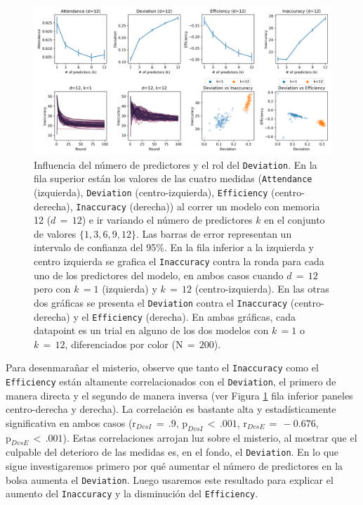 \documentclass[11pt]{amsart}
\begin{document}
\begin{figure}
\begin{center}
\includegraphics[width=.9\linewidth]{./Figuras/Figura2.png}
\caption{Influencia del número de predictores y el rol del \texttt{Deviation}. En la fila superior están los valores de las cuatro medidas (\texttt{Attendance} (izquierda), \texttt{Deviation} (centro-izquierda), \texttt{Efficiency} (centro-derecha), \texttt{Inaccuracy} (derecha)) al correr un modelo con memoria 12 ($d\,{=}\,12$) e ir variando el número de predictores $k$ en el conjunto de valores $\{1,3,6,9,12\}$. Las barras de error representan un intervalo de confianza del 95\%. En la fila inferior a la izquierda y centro izquierda se grafica el \texttt{Inaccuracy} contra la ronda para cada uno de los predictores del modelo, en ambos casos cuando $d\,{=}\,12$ pero con $k\,{=}1$ (izquierda) y $k\,{=}\,12$ (centro-izquierda). En las otras dos gráficas se presenta el \texttt{Deviation} contra el \texttt{Inaccuracy} (centro-derecha) y el \texttt{Efficiency} (derecha). En ambas gráficas, cada datapoint es un trial en alguno de los dos modelos con $k\,{=}1$ o $k\,{=}\,12$, diferenciados por color ($\mbox{N}\,{=}\,200$).}\label{fig:dev}
\end{center}
\end{figure}

Para desenmarañar el misterio, observe que tanto el \texttt{Inaccuracy} como el \texttt{Efficiency} están altamente correlacionados con el \texttt{Deviation}, el primero de manera directa y el segundo de manera inversa (ver Figura \ref{fig:dev} fila inferior paneles centro-derecha y derecha). La correlación es bastante alta y estadísticamente significativa en ambos casos ($\mbox{r}_{DvsI}\,{=}\,.9$, $\mbox{p}_{DvsI}\,{<}\,.001$, $\mbox{r}_{DvsE}\,{=}\,-0.676$, $\mbox{p}_{DvsE}\,{<}\,.001$). Estas correlaciones arrojan luz sobre el misterio, al mostrar que el culpable del deterioro de las medidas es, en el fondo, el \texttt{Deviation}. En lo que sigue investigaremos primero por qué aumentar el número de predictores en la bolsa aumenta el \texttt{Deviation}. Luego usaremos este resultado para explicar el aumento del \texttt{Inaccuracy} y la disminución del \texttt{Efficiency}.
\end{document}
